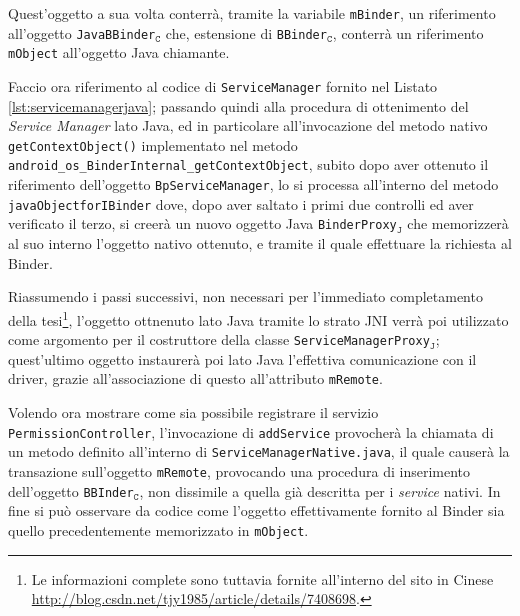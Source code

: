 Quest'oggetto a sua volta conterrà, tramite la variabile \texttt{\small mBinder},
un riferimento all'oggetto \texttt{\small JavaBBinder$_\mathtt{C}$} che, estensione
di \texttt{\small BBinder$_\mathtt{C}$}, conterrà un riferimento \texttt{\small mObject}
all'oggetto Java chiamante.

Faccio ora riferimento al codice di \texttt{\small ServiceManager} fornito nel Listato
\vref{lst:servicemanagerjava};
passando quindi alla procedura di ottenimento del \textit{Service Manager} lato Java,
ed in particolare all'invocazione del metodo nativo \texttt{\small getContextObject()}
implementato nel metodo \texttt{\small android\_os\_BinderInternal\_getContextObject},
subito dopo aver ottenuto il riferimento dell'oggetto \texttt{\small BpServiceManager}, lo
si processa all'interno del metodo \texttt{\small javaObjectforIBinder} dove, dopo
aver saltato i primi due controlli ed aver verificato il terzo, si creerà un
nuovo oggetto Java \texttt{\small BinderProxy$_\mathtt{J}$} che memorizzerà al
suo interno l'oggetto nativo ottenuto, e tramite il quale effettuare la richiesta
al Binder.



\begin{algorithm}[p]

\end{algorithm}

Riassumendo i passi successivi, non necessari per l'immediato completamento
della tesi\footnote{Le informazioni complete sono tuttavia fornite all'interno
del sito in Cinese \url{http://blog.csdn.net/tjy1985/article/details/7408698}.}, l'oggetto
ottnenuto lato Java tramite lo strato JNI verrà poi utilizzato come argomento
per il costruttore della classe \texttt{\small ServiceManagerProxy$_\mathtt{J}$}; 
quest'ultimo oggetto instaurerà poi lato Java l'effettiva comunicazione con il 
driver, grazie all'associazione di questo all'attributo \texttt{\small mRemote}.

Volendo ora mostrare come sia possibile registrare il servizio \texttt{\small PermissionController},
l'invocazione di \texttt{\small addService} provocherà la chiamata di un metodo
definito all'interno di \texttt{\small ServiceManagerNative.java}, il quale
causerà la transazione sull'oggetto \texttt{\small mRemote}, provocando una
procedura  di inserimento dell'oggetto \texttt{\small BBInder$_\mathtt{C}$}, 
non dissimile a quella già descritta per i \textit{service} nativi.
In fine si può osservare da codice come l'oggetto effettivamente fornito
al Binder sia quello precedentemente memorizzato in \texttt{\small mObject}.


